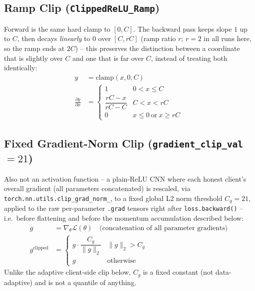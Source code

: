 \documentclass{article}
\begin{document}
\subsection{Ramp Clip (\texttt{ClippedReLU\_Ramp})}
Forward is the same hard clamp to $[0, C]$. The backward pass keeps slope $1$ up to
$C$, then decays \emph{linearly} to $0$ over $[C, rC]$ (ramp ratio $r$; $r=2$ in all
runs here, so the ramp ends at $2C$) -- this preserves the distinction between a
coordinate that is slightly over $C$ and one that is far over $C$, instead of treating
both identically:
\begin{align*}
    y &= \mathrm{clamp}(x, 0, C) \\
    \frac{\partial y}{\partial x} &=
    \begin{cases}
        1 & 0 < x \leq C \\
        \dfrac{rC - x}{rC - C} & C < x < rC \\
        0 & x \leq 0 \ \text{or}\ x \geq rC
    \end{cases}
\end{align*}

\subsection{Fixed Gradient-Norm Clip (\texttt{gradient\_clip\_val}$=21$)}
Also not an activation function -- a plain-ReLU CNN where each honest client's overall
gradient (all parameters concatenated) is rescaled, via
\texttt{torch.nn.utils.clip\_grad\_norm\_}, to a fixed global L2 norm threshold
$C_g = 21$, applied to the raw per-parameter \texttt{.grad} tensors right after
\texttt{loss.backward()} -- i.e.\ before flattening and before the momentum
accumulation described below:
\begin{align*}
    g &= \nabla_\theta \mathcal{L}(\theta) \quad \text{(concatenation of all parameter gradients)} \\
    g^{\text{clipped}} &=
    \begin{cases}
        g \cdot \dfrac{C_g}{\lVert g \rVert_2} & \lVert g \rVert_2 > C_g \\
        g & \text{otherwise}
    \end{cases}
\end{align*}
Unlike the adaptive client-side clip below, $C_g$ is a fixed constant (not
data-adaptive) and is not a quantile of anything.
\end{document}
